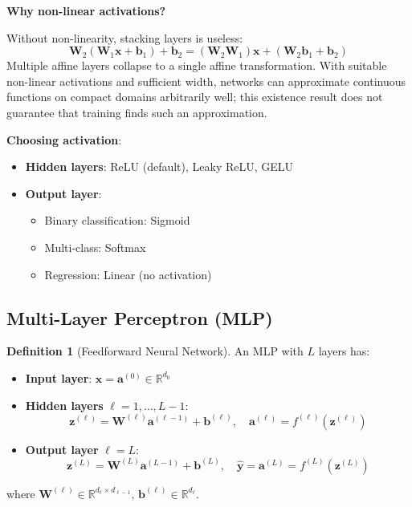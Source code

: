 \documentclass[11pt,twoside]{article}
\numberwithin{equation}{section}
\newcommand{\R}{\mathbb{R}}
\newcommand{\vect}[1]{\bm{#1}}
\theoremstyle{plain}
\theoremstyle{definition}
\newtheorem{definition}[theorem]{Definition}
\theoremstyle{remark}
\newenvironment{keyidea}{
  \begin{tcolorbox}[colback=yellow!5!white,
                    colframe=yellow!50!black,
                    title=Key Idea,
                    breakable,
                    enhanced,
                    sharp corners,
                    boxrule=0.8pt,
                    left=6pt, right=6pt, top=6pt, bottom=6pt]
}{
  \end{tcolorbox}
}
\begin{document}
\begin{keyidea}
\textbf{Why non-linear activations?}

Without non-linearity, stacking layers is useless:
\[
\vect{W}_2(\vect{W}_1\vect{x}+\vect{b}_1)+\vect{b}_2
= (\vect{W}_2\vect{W}_1)\vect{x}+(\vect{W}_2\vect{b}_1+\vect{b}_2)
\]
Multiple affine layers collapse to a single affine transformation. With suitable non-linear activations and sufficient width, networks can approximate continuous functions on compact domains arbitrarily well; this existence result does not guarantee that training finds such an approximation.

\textbf{Choosing activation}:
\begin{itemize}
\item \textbf{Hidden layers}: ReLU (default), Leaky ReLU, GELU
\item \textbf{Output layer}: 
\begin{itemize}
\item Binary classification: Sigmoid
\item Multi-class: Softmax
\item Regression: Linear (no activation)
\end{itemize}
\end{itemize}
\end{keyidea}

\subsection{Multi-Layer Perceptron (MLP)}

\begin{definition}[Feedforward Neural Network]
An MLP with $L$ layers has:
\begin{itemize}
\item \textbf{Input layer}: $\vect{x} = \vect{a}^{(0)} \in \R^{d_0}$
\item \textbf{Hidden layers} $\ell = 1, \ldots, L-1$:
\[
\vect{z}^{(\ell)} = \vect{W}^{(\ell)}\vect{a}^{(\ell-1)} + \vect{b}^{(\ell)}, \quad \vect{a}^{(\ell)} = f^{(\ell)}(\vect{z}^{(\ell)})
\]
\item \textbf{Output layer} $\ell = L$:
\[
\vect{z}^{(L)} = \vect{W}^{(L)}\vect{a}^{(L-1)} + \vect{b}^{(L)}, \quad \hat{\vect{y}} = \vect{a}^{(L)} = f^{(L)}(\vect{z}^{(L)})
\]
\end{itemize}
where $\vect{W}^{(\ell)} \in \R^{d_\ell \times d_{\ell-1}}$, $\vect{b}^{(\ell)} \in \R^{d_\ell}$.
\end{definition}
\end{document}
